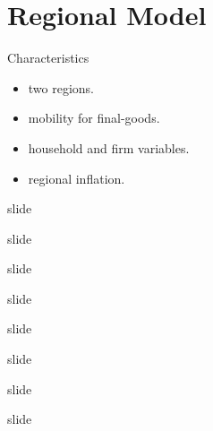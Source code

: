 \documentclass[
presentation.tex
]{subfiles}
\begin{document}
\section{Regional Model}


\begin{frame}{Characteristics}
	
	\begin{itemize}
		
		\item two regions.
		
		\item mobility for final-goods.
		
		\item household and firm variables.
		
		\item regional inflation.
		
	\end{itemize}
	
\end{frame}


\begin{frame}{slide}
	
	slide
	
\end{frame}


\begin{frame}{slide}
	
	slide
	
\end{frame}


\begin{frame}{slide}
	
	slide
	
\end{frame}


\begin{frame}{slide}
	
	slide
	
\end{frame}
\end{document}
